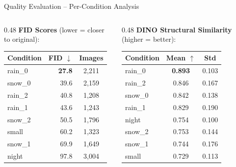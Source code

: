 \documentclass[aspectratio=169, 10pt]{beamer}
\begin{document}
\begin{frame}{Quality Evaluation -- Per-Condition Analysis}
\begin{columns}[T]
\begin{column}{0.48\textwidth}
\textbf{FID Scores} (lower = closer to original):

\vspace{0.3em}
{\small
\begin{tabular}{lrc}
\toprule
\textbf{Condition} & \textbf{FID $\downarrow$} & \textbf{Images} \\
\midrule
rain\_0          & \textbf{27.8} & 2,211 \\
snow\_0          & 39.6          & 2,159 \\
rain\_2          & 40.8          & 1,208 \\
rain\_1          & 43.6          & 1,243 \\
snow\_2          & 50.5          & 1,796 \\
small            & 60.2          & 1,323 \\
snow\_1          & 69.9          & 1,649 \\
night            & \textcolor{warnred}{97.8} & 3,004 \\
\bottomrule
\end{tabular}
}
\end{column}
\begin{column}{0.48\textwidth}
\textbf{DINO Structural Similarity} (higher = better):

\vspace{0.3em}
{\small
\begin{tabular}{lcc}
\toprule
\textbf{Condition} & \textbf{Mean $\uparrow$} & \textbf{Std} \\
\midrule
rain\_0          & \textbf{0.893} & 0.103 \\
rain\_2          & 0.846          & 0.167 \\
snow\_0          & 0.842          & 0.138 \\
rain\_1          & 0.829          & 0.190 \\
night            & 0.754          & 0.100 \\
snow\_2          & 0.753          & 0.144 \\
snow\_1          & 0.744          & 0.176 \\
small            & \textcolor{warnred}{0.729} & 0.113 \\
\bottomrule
\end{tabular}
}


\end{column}
\end{columns}
\end{frame}
\end{document}
